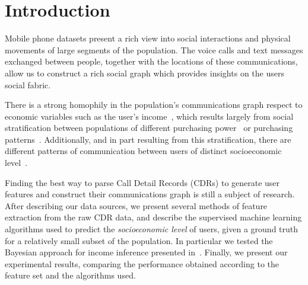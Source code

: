 
\section{Introduction}

Mobile phone datasets present a rich view into social interactions and physical movements of large segments of the population.
The voice calls and text messages exchanged between people, together with the locations of these communications, allow us to construct a rich social graph which provides insights on the users social fabric.

There is a strong homophily in the population's communications graph respect to economic variables such as the user's income~\cite{fixmanasonam2016}, which results largely from social stratification between populations of different purchasing power~\cite{leo2015socioeconomic} or purchasing patterns~\cite{Leo2016correlations}.
Additionally, and in part resulting from this stratification, there are different patterns of communication between users of distinct socioeconomic level~\cite{Luo2017inferring}.

Finding the best way to parse Call Detail Records (CDRs) to generate user features and construct their communications graph is still a subject of research.  After describing our data sources, we present several methods of feature extraction from the raw CDR data,
and describe the supervised machine learning algorithms used to predict the \emph{socioeconomic level} of users, given a ground truth for a relatively small subset of the population. In particular we tested the Bayesian approach for income inference presented in~\cite{fixmanasonam2016}.
Finally, we present our experimental results, comparing the performance obtained according to the feature set and the algorithms used.
